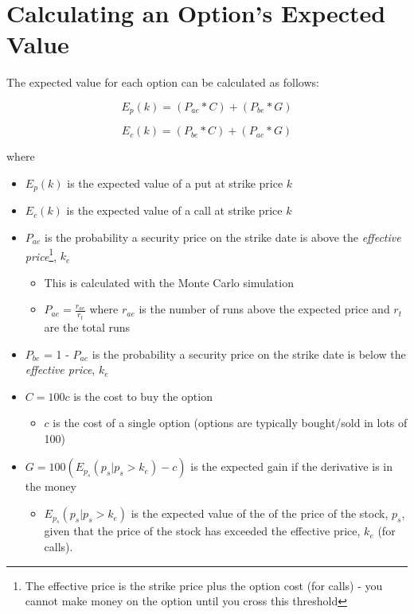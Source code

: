\documentclass[
]{book}
\providecommand{\tightlist}{%
  \setlength{\itemsep}{0pt}\setlength{\parskip}{0pt}}
\begin{document}
\hypertarget{calculating-an-options-expected-value}{%
\chapter{Calculating an Option's Expected Value}\label{calculating-an-options-expected-value}}

The expected value for each option can be calculated as follows:

\begin{equation} 
E_p(k) = (P_{ae} * C) + (P_{be} * G)
\label{eq:puts}
\end{equation}

\begin{equation} 
E_c(k) = (P_{be} * C) + (P_{ae} * G)
\label{eq:calls}
\end{equation}

where

\begin{itemize}
\tightlist
\item
  \(E_p(k)\) is the expected value of a put at strike price \(k\)
\item
  \(E_c(k)\) is the expected value of a call at strike price \(k\)
\item
  \(P_{ae}\) is the probability a security price on the strike date is above the
  \emph{effective price}\footnote{The effective price is the strike price plus the option cost
    (for calls) - you cannot make money on the option until you cross this
    threshold}, \(k_e\)

  \begin{itemize}
  \tightlist
  \item
    This is calculated with the Monte Carlo simulation
  \item
    \(P_{ae} = \frac{r_{ae}}{r_t}\) where \(r_{ae}\) is the number of runs above
    the expected price and \(r_t\) are the total runs
  \end{itemize}
\item
  \(P_{be}\) = 1 - \(P_{ae}\) is the probability a security price on the strike date
  is below the \emph{effective price}, \(k_e\)
\item
  \(C = 100c\) is the cost to buy the option

  \begin{itemize}
  \tightlist
  \item
    \(c\) is the cost of a single option (options are typically bought/sold in
    lots of 100)
  \end{itemize}
\item
  \(G = 100(E_{p_s}(p_s|p_s>k_e) - c)\) is the expected gain if the derivative
  is in the money

  \begin{itemize}
  \tightlist
  \item
    \(E_{p_s}(p_s|p_s>k_e)\) is the expected value of the of the price of the
    stock, \(p_s\), given that the price of the stock has exceeded the effective
    price, \(k_e\) (for calls).
  \end{itemize}
\end{itemize}
\end{document}
